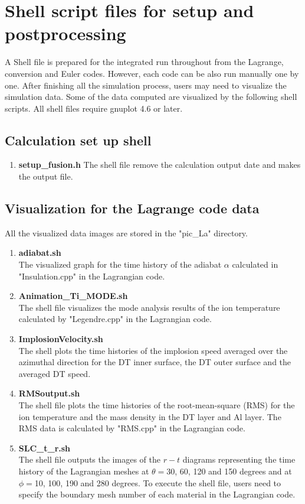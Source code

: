 %

\section{Shell script files for setup and postprocessing}
%
A Shell file is prepared for the integrated run throughout from the Lagrange, conversion and Euler codes. However, each code can be also run manually one by one.
%
After finishing all the simulation process, users may need to visualize the simulation data. Some of the data computed are visualized by the following shell scripts. All shell files require gnuplot 4.6 or later.

%
\subsection{Calculation set up shell}
\begin{enumerate}
\item{\bf setup\_fusion.h}
The shell file remove the calculation output date and makes the output file.
\end{enumerate}
%

\subsection{Visualization for the Lagrange code data}
All the visualized data images are stored in the "pic\_La" directory. 
\begin{enumerate}
\item{\bf adiabat.sh}\\
The visualized graph for the time history of the adiabat $\alpha$ calculated in "Insulation.cpp" in the Lagrangian code. 

\item{\bf Animation\_Ti\_MODE.sh}\\
The shell file visualizes the mode analysis results of the ion temperature calculated by "Legendre.cpp" in the Lagrangian code. 

\item{\bf ImplosionVelocity.sh}\\
The shell plots the time histories of the implosion speed averaged over the azimuthal direction for the DT inner surface, the DT outer surface and the averaged DT speed. 
\item{\bf RMSoutput.sh}\\
The shell file plots the time histories of the root-mean-square (RMS) for the ion temperature and the mass density in the DT layer and Al layer. The RMS data is calculated by "RMS.cpp" in the Lagrangian code. 
\item{\bf SLC\_t\_r.sh}\\
The shell file outputs the images of the $r-t$ diagrams representing the time history of the Lagrangian meshes at $\theta =$30, 60, 120 and 150 degrees and at $\phi =$10, 100, 190 and 280 degrees. To execute the shell file, users need to specify the boundary mesh number of each material in the Lagrangian code. 
\end{enumerate}

